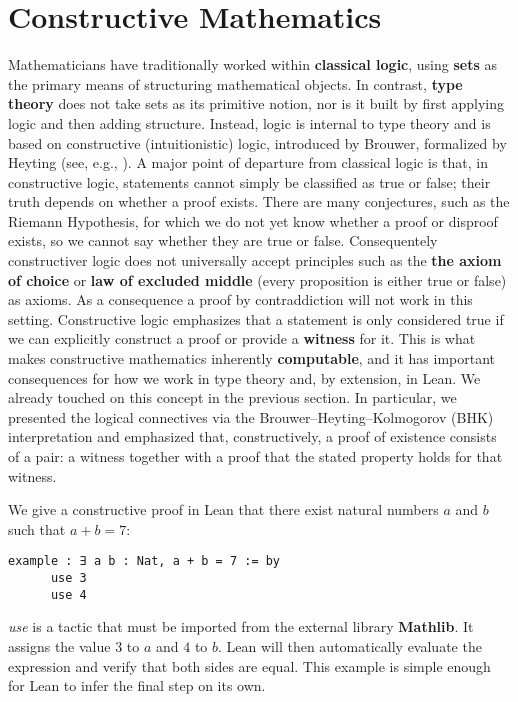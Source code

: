 
\section{Constructive Mathematics}

Mathematicians have traditionally worked within \textbf{classical logic}, 
using \textbf{sets} as the primary means of structuring mathematical objects. 
In contrast, \textbf{type theory} does not take sets as its primitive notion, 
nor is it built by first applying logic and then adding structure. 
Instead, logic is internal to type theory and is based on constructive (intuitionistic) 
logic, introduced by Brouwer, formalized by Heyting (see, e.g., \cite{girard1989proofs}).
A major point of departure from classical logic is that, in constructive logic, 
statements cannot simply be classified as true or false; 
their truth depends on whether a proof exists. 
There are many conjectures, such as the Riemann Hypothesis, 
for which we do not yet know whether a proof or disproof exists, 
so we cannot say whether they are true or false.
Consequentely constructiver logic does not universally accept principles such 
as the \textbf{the axiom of choice} or \textbf{law of excluded middle} 
(every proposition is either true or false) as axioms. 
As a consequence a proof by contraddiction will not work in this setting.
Constructive logic emphasizes that a statement is only 
considered true if we can explicitly construct 
a proof or provide a \textbf{witness} for it.
This is what makes constructive mathematics inherently \textbf{computable}, 
and it has important consequences for how we work in type theory and, by extension, 
in Lean.
We already touched on this concept in the previous section. 
In particular, we presented the logical connectives via the 
Brouwer–Heyting–Kolmogorov (BHK) interpretation and emphasized that, constructively, 
a proof of existence consists of a pair: 
a witness together with a proof that the stated property holds for that witness.
\begin{example}
    We give a constructive proof in Lean that there exist natural numbers $a$ and $b$ such that $a + b = 7$:
    \begin{lstlisting}[language=Lean]
    example : ∃ a b : Nat, a + b = 7 := by
      use 3
      use 4
    \end{lstlisting}
    \textit{use} is a tactic that must be imported from the external 
    library \textbf{Mathlib}. It assigns the value $3$ to $a$ and $4$ to $b$.  
    Lean will then automatically evaluate the expression and verify that both sides are equal.  
    This example is simple enough for Lean to infer the final step on its own.
\end{example}
